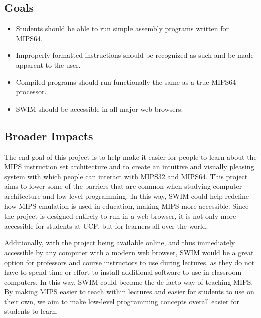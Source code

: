 \documentclass[
    paper=letter,
    parskip=half,
    fontsize=12pt,
    titlepage=firstiscover,
    toc=bibliography,
    numbers=endperiod
]{scrartcl}
\begin{document}
\subsection{Goals}

\begin{itemize}
    \item Students should be able to run simple assembly programs written for
          MIPS64.
    \item Improperly formatted instructions should be recognized as such and be
          made apparent to the user.
    \item Compiled programs should run functionally the same as a true MIPS64
          processor.
    \item SWIM should be accessible in all major web browsers.
\end{itemize}

\subsection{Broader Impacts}
The end goal of this project is to help make it easier for people to
learn about the MIPS instruction set architecture and to create an
intuitive and visually pleasing system with which people can interact
with MIPS32 and MIPS64. This project aims to lower some of the barriers
that are common when studying computer architecture and low-level
programming. In this way, SWIM could help redefine how MIPS emulation is
used in education, making MIPS more accessible. Since the project is
designed entirely to run in a web browser, it is not only more
accessible for students at UCF, but for learners all over the world.

Additionally, with the project being available online, and thus
immediately accessible by any computer with a modern web browser, SWIM
would be a great option for professors and course instructors to use
during lectures, as they do not have to spend time or effort to install
additional software to use in classroom computers. In this way, SWIM
could become the de facto way of teaching MIPS. By making MIPS easier to
teach within lectures and easier for students to use on their own, we
aim to make low-level programming concepts overall easier for students
to learn.
\end{document}
